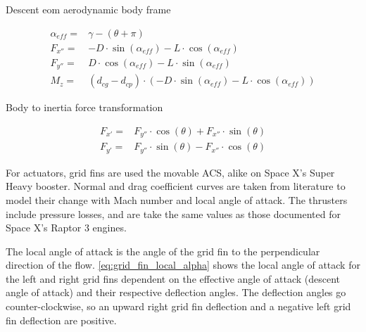 Descent eom aerodynamic body frame

\begin{equation}
\begin{aligned}
    \alpha_{eff} =& \gamma - (\theta + \pi) \\
     F_{x''} =& -D \cdot \sin(\alpha_{eff}) - L \cdot \cos(\alpha_{eff}) \\
    F_{y''} =& D \cdot \cos(\alpha_{eff}) - L \cdot \sin(\alpha_{eff}) \\
     M_z =& (d_{cg} - d_{cp}) \cdot( -D \cdot \sin(\alpha_{eff}) - L \cdot \cos(\alpha_{eff}))
\end{aligned}
\end{equation}

Body to inertia force transformation

\begin{equation}
\begin{aligned}
    F_{x'} =& F_{y''} \cdot \cos(\theta) + F_{x''} \cdot \sin(\theta) \\
    F_{y'} =& F_{y''} \cdot \sin(\theta) - F_{x''} \cdot \cos(\theta)
\end{aligned}
\label{eq:inertial_aero}
\end{equation}    

For actuators, grid fins are used the movable ACS, alike on Space X's Super Heavy booster. Normal and drag coefficient curves are taken from literature \cite{washington1993grid} to model their change with Mach number and local angle of attack. The thrusters include pressure losses, and are take the same values as those documented for Space X's Raptor 3 engines.

The local angle of attack is the angle of the grid fin to the perpendicular direction of the flow. \autoref{eq:grid_fin_local_alpha} shows the local angle of attack for the left and right grid fins dependent on the effective angle of attack (descent angle of attack) and their respective deflection angles. The deflection angles go counter-clockwise, so an upward right grid fin deflection and a negative left grid fin deflection are positive.

